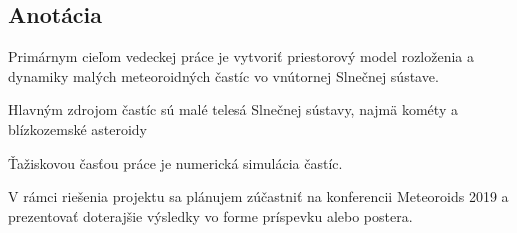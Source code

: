 \subsection{Anotácia}\label{anotuxe1cia}

Primárnym cieľom vedeckej práce je vytvoriť priestorový model rozloženia
a dynamiky malých meteoroidných častíc vo vnútornej Slnečnej sústave.

Hlavným zdrojom častíc sú malé telesá Slnečnej sústavy, najmä kométy a
blízkozemské asteroidy

Ťažiskovou časťou práce je numerická simulácia častíc.

V rámci riešenia projektu sa plánujem zúčastniť na konferencii
Meteoroids 2019 a prezentovať doterajšie výsledky vo forme príspevku
alebo postera.

